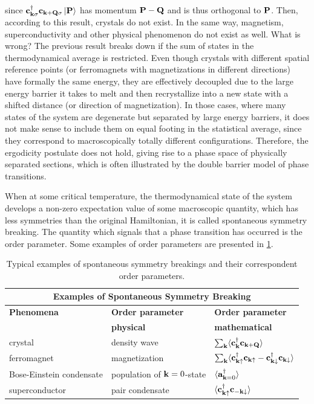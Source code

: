 \documentclass{homework}
\begin{document}
since ${\bf c}_{{\bf k}\sigma}^\dagger {\bf c}_{{\bf k + Q}\sigma} \ket{{\bf P}}$ has momentum ${\bf P} - {\bf Q}$ and is thus orthogonal to ${\bf P}$. Then, according to this result, crystals do not exist. In the same way, magnetism, superconductivity and other physical phenomenon do not exist as well. What is wrong? The previous result breaks down if the sum of states in the thermodynamical average is restricted. Even though crystals with different spatial reference points (or ferromagnets with magnetizations in different directions) have formally the same energy, they are effectively decoupled due to the large energy barrier it takes to melt and then recrystallize into a new state with a shifted distance (or direction of magnetization). In those cases, where many states of the system are degenerate but separated by large energy barriers, it does not make sense to include them on equal footing in the statistical average, since they correspond to macroscopically totally different configurations. Therefore, the ergodicity postulate does not hold, giving rise to a phase space of physically separated sections, which is often illustrated by the double barrier model of phase transitions. 

When at some critical temperature, the thermodynamical state of the system develops a non-zero expectation value of some macroscopic quantity, which has less symmetries than the original Hamiltonian, it is called spontaneous symmetry breaking. The quantity which signals that a phase transition has occurred is the order parameter. Some examples of order parameters are presented in \cref{order paras table}.

\begin{table}[!h]
\centering
\begin{tabular}{ |p{5cm}||p{5cm}|p{4cm}|  }
 \hline
 \multicolumn{3}{|c|}{Examples of Spontaneous Symmetry Breaking} \\
 \hline
 \textbf{Phenomena} & \textbf{Order parameter} & \textbf{ Order parameter} \\
 & \textbf{ physical } & \textbf{ mathematical }\\
 \hline
 crystal & density wave & $\sum_{{\bf k}} \langle {\bf c}_{{\bf k}}^\dagger {\bf c}_{{\bf k} + {\bf Q}} \rangle $\\
 ferromagnet & magnetization & $\sum_{{\bf k}} \langle {\bf c}_{{\bf k}\uparrow}^\dagger {\bf c}_{{\bf k}\uparrow} - {\bf c}_{{\bf k}\downarrow}^\dagger {\bf c}_{{\bf k}\downarrow} \rangle$\\
 Bose-Einstein condensate & population of ${\bf k}=0$-state & $\langle {\bf a}_{{\bf k} = 0}^\dagger \rangle$\\
 superconductor & pair condensate & $\langle {\bf c}_{{\bf k} \uparrow}^\dagger {\bf c}_{-{\bf k}\downarrow} \rangle$ \\
 \hline
\end{tabular}
 \caption{Typical examples of spontaneous symmetry breakings and their correspondent order parameters. }
 \label{order paras table}
\end{table}
\end{document}
